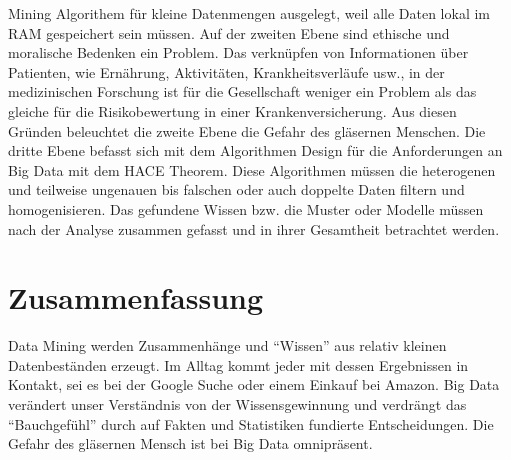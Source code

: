 \documentclass[12pt,journal,compsoc]{IEEEtran}
\begin{document}
Mining Algorithem für kleine Datenmengen ausgelegt, weil alle Daten lokal im RAM gespeichert sein müssen.  
Auf der zweiten Ebene sind ethische und moralische Bedenken ein Problem. Das verknüpfen von Informationen über Patienten, wie Ernährung,
Aktivitäten, Krankheitsverläufe usw., in der medizinischen 
Forschung ist für die Gesellschaft weniger ein Problem als das gleiche für die Risikobewertung in einer Krankenversicherung.  Aus diesen 
Gründen beleuchtet die zweite Ebene die Gefahr des gläsernen Menschen. Die dritte Ebene befasst sich mit dem Algorithmen Design für die 
Anforderungen an Big Data mit dem HACE Theorem. Diese Algorithmen müssen die heterogenen und teilweise ungenauen bis falschen oder auch 
doppelte Daten filtern und homogenisieren. Das gefundene Wissen bzw. die Muster oder Modelle müssen nach der Analyse zusammen gefasst und in ihrer 
Gesamtheit betrachtet werden. 
\section{Zusammenfassung}
 Data Mining werden Zusammenhänge und \enquote{Wissen} aus relativ kleinen Datenbeständen erzeugt. Im Alltag kommt jeder 
mit dessen Ergebnissen in Kontakt, sei es bei der Google Suche oder einem Einkauf bei Amazon. Big Data verändert unser Verständnis von der 
Wissensgewinnung und verdrängt das \enquote{Bauchgefühl} durch auf Fakten und Statistiken fundierte Entscheidungen. Die Gefahr des gläsernen Mensch ist bei Big Data omnipräsent.




%
%
\end{document}
